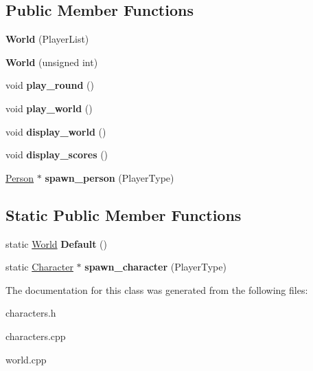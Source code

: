 \subsection*{Public Member Functions}
\begin{DoxyCompactItemize}
\item 
\hypertarget{class_world_a11cba0453925ea62efa36ba293d9ca18}{{\bfseries World} (Player\-List)}\label{class_world_a11cba0453925ea62efa36ba293d9ca18}

\item 
\hypertarget{class_world_a18a5e578925e7a077b93e689c0f70f18}{{\bfseries World} (unsigned int)}\label{class_world_a18a5e578925e7a077b93e689c0f70f18}

\item 
\hypertarget{class_world_a8027a11b4e3648efebb8daa10f604af1}{void {\bfseries play\-\_\-round} ()}\label{class_world_a8027a11b4e3648efebb8daa10f604af1}

\item 
\hypertarget{class_world_aed8db20661bca96ce422ac52443e94c8}{void {\bfseries play\-\_\-world} ()}\label{class_world_aed8db20661bca96ce422ac52443e94c8}

\item 
\hypertarget{class_world_ac9f7fe8fa51a0053bc4718440ff74a31}{void {\bfseries display\-\_\-world} ()}\label{class_world_ac9f7fe8fa51a0053bc4718440ff74a31}

\item 
\hypertarget{class_world_a0395c6476390f68426ef1a32a204ee4f}{void {\bfseries display\-\_\-scores} ()}\label{class_world_a0395c6476390f68426ef1a32a204ee4f}

\item 
\hypertarget{class_world_a64518dfec673924e6efd0a0fac005b4a}{\hyperlink{class_person}{Person} $\ast$ {\bfseries spawn\-\_\-person} (Player\-Type)}\label{class_world_a64518dfec673924e6efd0a0fac005b4a}

\end{DoxyCompactItemize}
\subsection*{Static Public Member Functions}
\begin{DoxyCompactItemize}
\item 
\hypertarget{class_world_a66d9361da0f0e8bba0c43037a9392744}{static \hyperlink{class_world}{World} {\bfseries Default} ()}\label{class_world_a66d9361da0f0e8bba0c43037a9392744}

\item 
\hypertarget{class_world_a2c923740175b0860080b5aa2859112f5}{static \hyperlink{class_character}{Character} $\ast$ {\bfseries spawn\-\_\-character} (Player\-Type)}\label{class_world_a2c923740175b0860080b5aa2859112f5}

\end{DoxyCompactItemize}


The documentation for this class was generated from the following files\-:\begin{DoxyCompactItemize}
\item 
characters.\-h\item 
characters.\-cpp\item 
world.\-cpp\end{DoxyCompactItemize}
